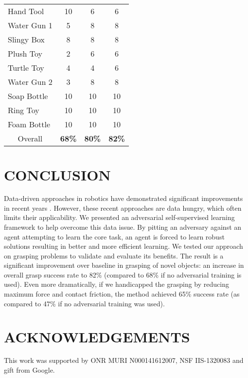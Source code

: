 \documentclass[letterpaper, 10 pt, conference]{ieeeconf}  %
\begin{document}
\begin{table}[]
\begin{tabular}{l|c|c|c|}
Hand Tool  &10 & 6 & 6 \\
Water Gun 1  & 5 & 8 & 8 \\
Slingy Box &  8 & 8 & 8 \\
Plush Toy &  2 & 6 & 6 \\
Turtle Toy &  4 & 4 & 6 \\
Water Gun 2 & 3 & 8 & 8 \\
Soap Bottle &  10 & 10 & 10 \\
Ring Toy & 10 & 10 & 10 \\
Foam Bottle &  10 & 10 & 10 \\ \hline
\multicolumn{1}{c|}{Overall} & \textbf{68\%} & \textbf{80\%} & \textbf{82\%}
\end{tabular}
\end{table}
\section{CONCLUSION}
Data-driven approaches in robotics have demonstrated significant improvements in recent years  \cite{lenz2015deep, pinto2016supersizing, pinto2016curious, levine2016end, levine2016learning}.  However, these recent approaches are data hungry, which often limits their applicability. We presented an adversarial self-supervised learning framework to help overcome this data issue. By pitting an adversary against an agent attempting to learn the core task, an agent is forced to learn robust solutions resulting in better and more efficient learning. We tested our approach on grasping problems to validate and evaluate its benefits.  The result is a significant improvement over baseline in grasping of novel objects: an increase in overall grasp success rate to 82\% (compared to 68\% if no adversarial training is used).  Even more dramatically, if we handicapped the grasping by reducing maximum force and contact friction, the method achieved 65\% success rate (as compared to 47\% if no adversarial training was used).

\section*{ACKNOWLEDGEMENTS}
This work was supported by ONR MURI N000141612007, NSF IIS-1320083 and gift from Google.



\end{document}
